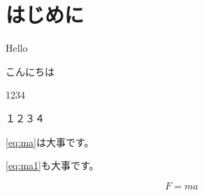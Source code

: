 \documentclass[../../../main]{subfiles}
\begin{document}
\section{はじめに}

Hello

こんにちは

1234

１２３４

\ref{eq:ma}は大事です。

\ref{eq:ma1}も大事です。

\begin{equation}\label{eq:ma1}
    F = ma
\end{equation}
\end{document}
